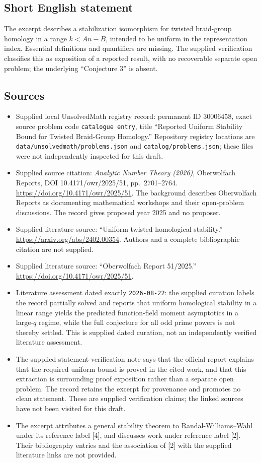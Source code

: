 \documentclass[11pt]{article}
\begin{document}
\subsection{Short English statement}
The excerpt describes a stabilization isomorphism for twisted braid-group homology in a range \(k<An-B\), intended to be uniform in the representation index. Essential definitions and quantifiers are missing. The supplied verification classifies this as exposition of a reported result, with no recoverable separate open problem; the underlying ``Conjecture 3'' is absent.
\subsection{Sources}
\begin{itemize}
\item Supplied local UnsolvedMath registry record: permanent ID \(30006458\), exact source problem code \texttt{catalogue entry}, title ``Reported Uniform Stability Bound for Twisted Braid-Group Homology.'' Repository registry locations are \texttt{data/unsolvedmath/problems.json} and \texttt{catalog/problems.json}; these files were not independently inspected for this draft.
\item Supplied source citation: \emph{Analytic Number Theory (2026)}, Oberwolfach Reports, DOI 10.4171/owr/2025/51, pp.\ 2701--2764. \url{https://doi.org/10.4171/owr/2025/51}. The background describes Oberwolfach Reports as documenting mathematical workshops and their open-problem discussions. The record gives proposed year 2025 and no proposer.
\item Supplied literature source: ``Uniform twisted homological stability.'' \url{https://arxiv.org/abs/2402.00354}. Authors and a complete bibliographic citation are not supplied.
\item Supplied literature source: ``Oberwolfach Report 51/2025.'' \url{https://doi.org/10.4171/owr/2025/51}.
\item Literature assessment dated exactly \texttt{2026-08-22}: the supplied curation labels the record partially solved and reports that uniform homological stability in a linear range yields the predicted function-field moment asymptotics in a large-\(q\) regime, while the full conjecture for all odd prime powers is not thereby settled. This is supplied dated curation, not an independently verified literature assessment.
\item The supplied statement-verification note says that the official report explains that the required uniform bound is proved in the cited work, and that this extraction is surrounding proof exposition rather than a separate open problem. The record retains the excerpt for provenance and promotes no clean statement. These are supplied verification claims; the linked sources have not been visited for this draft.
\item The excerpt attributes a general stability theorem to Randal-Williams--Wahl under its reference label [4], and discusses work under reference label [2]. Their bibliography entries and the association of [2] with the supplied literature links are not provided.
\end{itemize}
\end{document}

